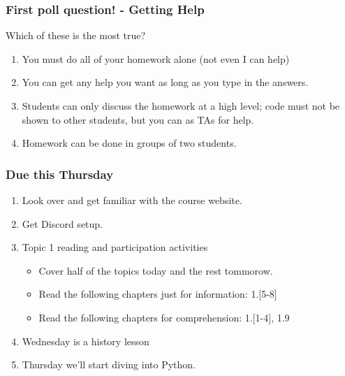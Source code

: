 \documentclass{beamer}
\begin{document}
\begin{frame}
  \frametitle{First poll question! - Getting Help}
  Which of these is the most true?
  \begin{enumerate}[A]
    \item You must do all of your homework alone (not even I can help)
    \item You can get any help you want as long as you type in the answers.
    \item Students can only discuss the homework at a high level; code must not be shown to other students, but you can as TAs for help.
    \item Homework can be done in groups of two students.
  \end{enumerate}
\end{frame}

\begin{frame}
  \frametitle{Due this Thursday}
  \begin{enumerate}
    \item Look over and get familiar with the course website. 
    \item Get Discord setup.
    \item Topic 1 reading and participation activities
      \begin{itemize}
        \item Cover half of the topics today and the rest tommorow.
        \item Read the following chapters just for information: 1.[5-8]
        \item Read the following chapters for comprehension: 1.[1-4], 1.9
      \end{itemize}
    \item Wednesday is a history lesson
    \item Thursday we'll start diving into Python.
  \end{enumerate}
\end{frame}
\end{document}
